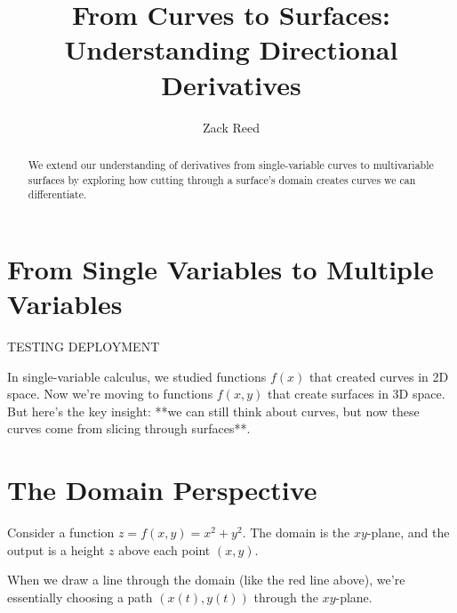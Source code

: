 \documentclass{ximera}
\title{From Curves to Surfaces: Understanding Directional Derivatives}
\author{Zack Reed}
\begin{document}
\begin{abstract}
We extend our understanding of derivatives from single-variable curves to multivariable surfaces by exploring how cutting through a surface's domain creates curves we can differentiate.
\end{abstract}
\maketitle

\section{From Single Variables to Multiple Variables}

TESTING DEPLOYMENT

In single-variable calculus, we studied functions $f(x)$ that created curves in 2D space. Now we're moving to functions $f(x,y)$ that create surfaces in 3D space. But here's the key insight: **we can still think about curves, but now these curves come from slicing through surfaces**.

\section{The Domain Perspective}

Consider a function $z = f(x,y) = x^2 + y^2$. The domain is the $xy$-plane, and the output is a height $z$ above each point $(x,y)$.


When we draw a line through the domain (like the red line above), we're essentially choosing a path $(x(t), y(t))$ through the $xy$-plane.
\end{document}
